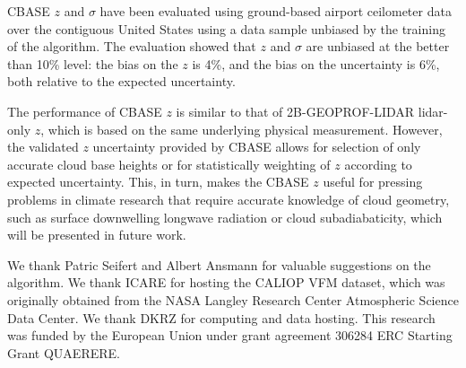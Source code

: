 \documentclass[essd,manuscript]{copernicus}\usepackage[]{graphicx}\usepackage[]{color}
\newcommand\CBH{\ensuremath{z}}
\begin{document}
CBASE \CBH{} and $\sigma$ have been evaluated using
ground-based airport ceilometer data over the contiguous United States using a
data sample unbiased by the training of the algorithm.  The evaluation showed that
\CBH{} and $\sigma$ are unbiased at the better
than 10\% level: the bias on the \CBH{} is %
4\%,
and the bias on the uncertainty is %
6\%, both relative to the expected uncertainty.

The performance of CBASE \CBH{} is similar to that of 2B-GEOPROF-LIDAR
lidar-only \CBH{}, which is based on the same underlying physical measurement.
However, the validated \CBH{} uncertainty provided by CBASE allows for selection
of only accurate cloud base heights or for statistically weighting of \CBH{}
according to expected uncertainty.  This, in turn, makes the CBASE \CBH{} useful
for pressing problems in climate research that require accurate knowledge of
cloud geometry, such as surface downwelling longwave radiation or cloud
subadiabaticity, which will be presented in future work.

\begin{acknowledgements}
  We thank Patric Seifert and Albert Ansmann for valuable suggestions on the
  algorithm.  We thank ICARE for hosting the CALIOP VFM dataset, which was
  originally obtained from the NASA Langley Research Center Atmospheric Science
  Data Center.  We thank DKRZ for computing and data hosting.  This research was
  funded by the European Union under grant agreement 306284 ERC Starting Grant
  QUAERERE.
\end{acknowledgements}



\end{document}
